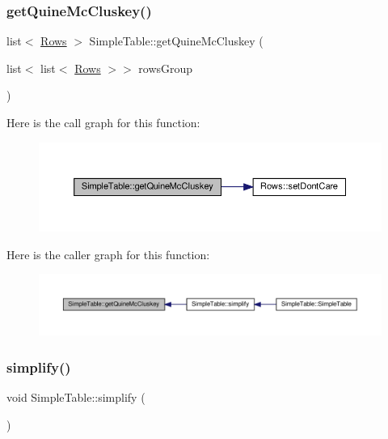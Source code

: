 \subsubsection{\texorpdfstring{get\+Quine\+Mc\+Cluskey()}{getQuineMcCluskey()}}
{\footnotesize\ttfamily list$<$ \hyperlink{class_rows}{Rows} $>$ Simple\+Table\+::get\+Quine\+Mc\+Cluskey (\begin{DoxyParamCaption}\item[{list$<$ list$<$ \hyperlink{class_rows}{Rows} $>$$>$}]{rows\+Group }\end{DoxyParamCaption})\hspace{0.3cm}{\ttfamily [private]}}

Here is the call graph for this function\+:\nopagebreak
\begin{figure}[H]
\begin{center}
\leavevmode
\includegraphics[width=350pt]{d0/d52/class_simple_table_a4d4e552c725f1306708a5918365f7d26_cgraph}
\end{center}
\end{figure}
Here is the caller graph for this function\+:\nopagebreak
\begin{figure}[H]
\begin{center}
\leavevmode
\includegraphics[width=350pt]{d0/d52/class_simple_table_a4d4e552c725f1306708a5918365f7d26_icgraph}
\end{center}
\end{figure}
\mbox{\label{class_simple_table_ad94b85aed20f08c4513394cec5d11fe1}} 
\subsubsection{\texorpdfstring{simplify()}{simplify()}}
{\footnotesize\ttfamily void Simple\+Table\+::simplify (\begin{DoxyParamCaption}{ }\end{DoxyParamCaption})\hspace{0.3cm}{\ttfamily [private]}}

